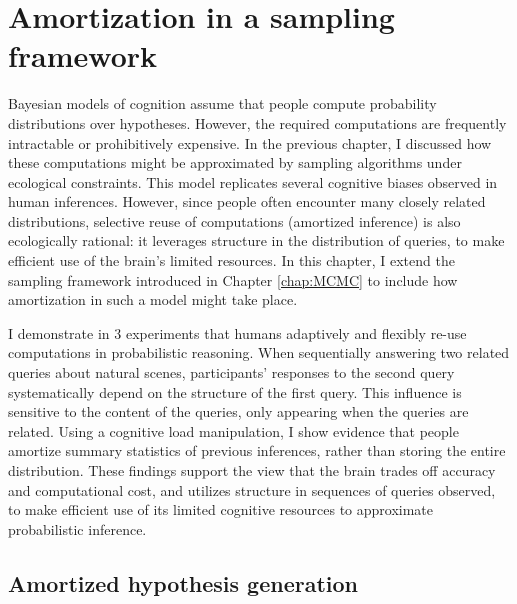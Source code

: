 
\chapter{Amortization in a sampling framework}
\label{chap:MCMC_amort}

Bayesian models of cognition assume that people compute probability distributions over hypotheses. However, the required computations are frequently intractable or prohibitively expensive. In the previous chapter, I discussed how these computations might be approximated by sampling algorithms under ecological constraints. This model replicates several cognitive biases observed in human inferences. However, since people often encounter many closely related distributions, selective reuse of computations (amortized inference) is also ecologically rational: it leverages structure in the distribution of queries, to make efficient use of the brain’s limited resources. In this chapter, I extend the sampling framework introduced in Chapter \ref{chap:MCMC} to include how amortization in such a model might take place. 

I demonstrate in 3 experiments that humans adaptively and flexibly re-use computations in probabilistic reasoning. When sequentially answering two related queries about natural scenes, participants’ responses to the second query systematically depend on the structure of the first query. This influence is sensitive to the content of the queries, only appearing when the queries are related. Using a cognitive load manipulation, I show evidence that people amortize summary statistics of previous inferences, rather than storing the entire distribution. These findings support the view that the brain trades off accuracy and computational cost, and utilizes structure in sequences of queries observed, to make efficient use of its limited cognitive resources to approximate probabilistic inference.

\section{Amortized hypothesis generation}

